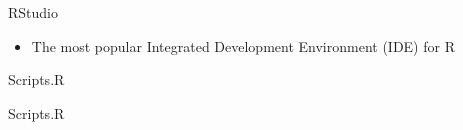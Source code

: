 \documentclass[ignorenonframetext,]{beamer}
\providecommand{\tightlist}{%
  \setlength{\itemsep}{0pt}\setlength{\parskip}{0pt}}
\begin{document}
\begin{frame}{RStudio}

\begin{itemize}
\tightlist
\item
  The most popular Integrated Development Environment (IDE) for R
\end{itemize}

\end{frame}

\begin{frame}{Scripts.R}

\end{frame}

\begin{frame}{Scripts.R}

\end{frame}
\end{document}
